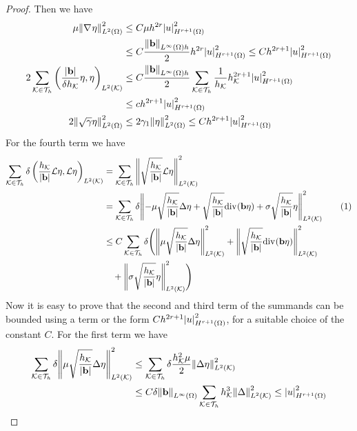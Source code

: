 \begin{proof}
    Then we have 
    \begin{align*}
        \mu \norm{\nabla\mspace{1mu} \eta}_{L^2(\Omega)}^2 &\leq C\mu h^{2r} \abs{u}_{H^{r+1}(\Omega)}^2 \\
        &\leq C\frac{\norm{\textbf{b}}_{L^\infty(\Omega) h}}{2} h^{2r} \abs{u}^2_{H^{r+1}(\Omega)} \leq C h^{2r+1}\abs{u}_{H^{r+1}(\Omega)}^2\\
        2\sum_{\mathcal{K}\in\mathcal{T}_h} \left( \frac{\abs{\textbf{b}}}{\delta h_{\mathcal{K}}} \eta, \eta \right)_{L^2(\mathcal{K})} &\leq  C\frac{\norm{\textbf{b}}_{L^\infty(\Omega) h}}{2} \sum_{\mathcal{K}\in\mathcal{T}_h} \frac{1}{h_{\mathcal{K}}} h^{2r+1}_{\mathcal{K}} \abs{u}^2_{H^{r+1}(\Omega)} \\
        &\leq c h^{2r+1} \abs{u}^2_{H^{r+1}(\Omega)} \\
        2 \norm{\sqrt{\gamma}\eta}_{L^2(\Omega)}^2 &\leq 2\gamma_1 \norm{\eta}_{L^2(\Omega)}^2 \leq Ch^{2r+1} \abs{u}^2_{H^{r+1}(\Omega)} 
    \end{align*} 
    For the fourth term we have 
    \begin{align*}
        \sum_\eit \delta \left( \frac{h_\element}{\vecbabs}\mathcal{L}\eta, \mathcal{L}\eta \right)_{L^2(\element)} &= \sum_\eit \norm{\sqrt{\frac{h_\element}{\vecbabs}} \mathcal{L}\eta}_{L^2(\element)}^2 \\
        &= \sum_\eit \delta \norm{-\mu \sqrt{\frac{h_\element}{\vecbabs}} \Delta \eta + \sqrt{\frac{h_\element}{\vecbabs}} \div(\vect{b}\eta) + \sigma \sqrt{\frac{h_\element}{\vecbabs}} \eta}_{L^2(\element)}^2 \stepcounter{equation}\tag{\theequation}\label{fourth_term_adr}\\
        &\leq C \sum_\eit \delta \Bigg(\norm{\mu \sqrt{\frac{h_\element}{\vecbabs}} \Delta \eta}_{L^2(\element)}^2 + \norm{\sqrt{\frac{h_\element}{\vecbabs}} \div(\vect{b}\eta)}^2_{L^2(\element)} \\
        &\quad + \norm{\sigma \sqrt{\frac{h_\element}{\vecbabs}}\eta}_{L^2(\element)}^2\Bigg) 
    \end{align*}
    Now it is easy to prove that the second and third term of the summands can be bounded using a term or the form \(Ch^{2r+1}\abs{u}_{H^{r+1}(\Omega)}^2\), for a suitable choice of the constant \(C\). For the first term we have 
    \begin{align*}
        \sum_\eit \delta \norm{\mu \sqrt{\frac{h_\element}{\vecbabs}} \Delta \eta}^2_{L^2(\element)} &\leq \sum_\eit \delta \frac{h^2_\element \mu}{2} \norm{\Delta \eta}^2_{L^2(\element)} \\
        &\leq C \delta \norm{\vect{b}}_{L^\infty(\Omega)}\sum_\eit h^3_\element \norm{\Delta}_{L^2(\element)}^2 \leq \abs{u}_{H^{r+1}(\Omega)}^2

\end{align*}
\end{proof}
